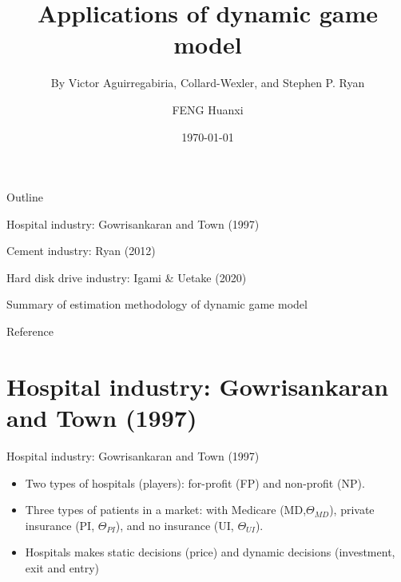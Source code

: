 \documentclass[aspectratio=169]{beamer}  %
\title{Applications of dynamic game model}
\subtitle{By Victor Aguirregabiria, Collard-Wexler, and Stephen P. Ryan}
\author{FENG Huanxi}
\date{\today}
\begin{document}
\begin{frame}
    \titlepage
\end{frame}

\begin{frame}{Outline}
    \item Hospital industry: Gowrisankaran and Town (1997)
    \item    
    \item Cement industry: Ryan (2012) 
    \item    
    \item Hard disk drive industry: Igami \& Uetake (2020)
    \item   
    \item Summary of estimation methodology of dynamic game model
    \item   
    \item Reference
\end{frame}

\section{Hospital industry: Gowrisankaran and Town (1997)}
\begin{frame}{Hospital industry: Gowrisankaran and Town (1997)}
    \begin{itemize}
        \item Two types of hospitals (players): for-profit (FP) and non-profit (NP).
        \item Three types of patients in a market: with Medicare (MD,$\Theta_{MD}$), private insurance (PI, $\Theta_{PI}$), and no insurance (UI, $\Theta_{UI}$).
        \item Hospitals makes static decisions (price) and dynamic decisions (investment, exit and entry)
        
    \end{itemize}
\end{frame}
\end{document}
